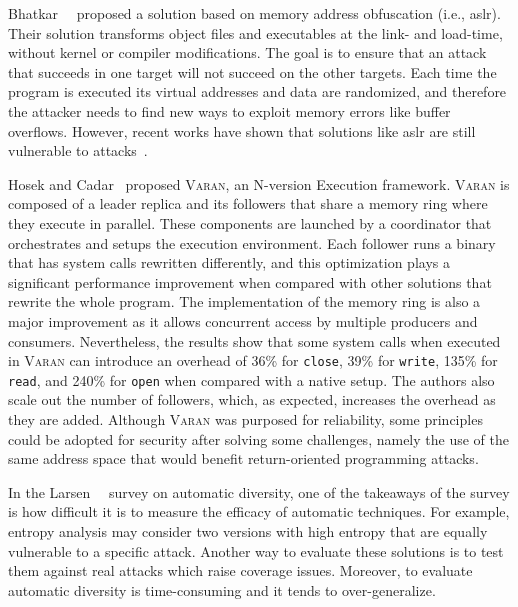 Bhatkar~\etal{}~\cite{Bhatkar:2003} proposed a solution based on memory address obfuscation (i.e., \gls{aslr}). 
Their solution transforms object files and executables at the link- and load-time, without kernel or compiler modifications. 
The goal is to ensure that an attack that succeeds in one target will not succeed on the other targets. 
Each time the program is executed its virtual addresses and data are randomized, and therefore the attacker needs to find new ways to exploit memory errors like buffer overflows. 
However, recent works have shown that solutions like \gls{aslr} are still vulnerable to attacks~\cite{Bittau:2014,Jang:2016}.


Hosek and Cadar~\cite{Hosek:2015} proposed \textsc{Varan}, an N-version Execution framework.
\textsc{Varan} is composed of a leader replica and its followers that share a memory ring where they execute in parallel.
These components are launched by a coordinator that orchestrates and setups the execution environment.
Each follower runs a binary that has system calls rewritten differently, and this optimization plays a significant performance improvement when compared with other solutions that rewrite the whole program.
The implementation of the memory ring is also a major improvement as it allows concurrent access by multiple producers and consumers.
Nevertheless, the results show that some system calls when executed in \textsc{Varan} can introduce an overhead of 36\% for \texttt{close}, 39\% for \texttt{write}, 135\% for \texttt{read}, and 240\% for \texttt{open} when compared with a native setup.
The authors also scale out the number of followers, which, as expected, increases the overhead as they are added. 
Although \textsc{Varan} was purposed for reliability, some principles could be adopted for security after solving some challenges, namely the use of the same address space that would benefit return-oriented programming attacks.

In the Larsen~\etal{}~\cite{Larsen:2015} survey on automatic diversity, one of the takeaways of the survey is how difficult it is to measure the efficacy of automatic techniques.
For example, entropy analysis may consider two versions with high entropy that are equally vulnerable to a specific attack.
Another way to evaluate these solutions is to test them against real attacks which raise coverage issues.
Moreover, to evaluate automatic diversity is time-consuming and it tends to over-generalize.



